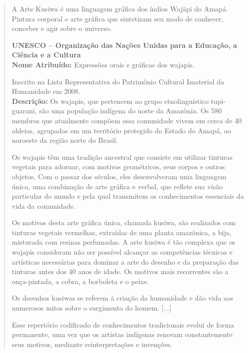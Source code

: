 \begin{quote}
A Arte Kusiwa é uma linguagem gráfica dos índios Wajãpi do Amapá.
Pintura corporal e arte gráfica que sintetizam seu modo de conhecer,
conceber e agir sobre o universo.

\textbf{UNESCO -- Organização das Nações Unidas para a Educação, a
Ciência e a Cultura}\\
\textbf{Nome Atribuído:} Expressões orais e gráficas dos wajapis.

Inscrito na Lista Representativa do Patrimônio Cultural Imaterial da
Humanidade em 2008.\\
\textbf{Descrição:} Os wajapis, que pertencem ao grupo etnolinguístico
tupi-guarani, são uma população indígena do norte da Amazônia. Os 580
membros que atualmente compõem essa comunidade vivem em cerca de 40
aldeias, agrupadas em um território protegido do Estado do Amapá, ao
noroeste da região norte do Brasil.

Os wajapis têm uma tradição ancestral que consiste em utilizar tinturas
vegetais para adornar, com motivos geométricos, seus corpos e outros
objetos. Com o passar dos séculos, eles desenvolveram uma linguagem
única, uma combinação de arte gráfica e verbal, que reflete sua visão
particular do mundo e pela qual transmitem os conhecimentos essenciais
da vida da comunidade.

Os motivos desta arte gráfica única, chamada kusiwa, são realizados com
tinturas vegetais vermelhas, extraídas de uma planta amazônica, a bija,
misturada com resinas perfumadas. A arte kusiwa é tão complexa que os
wajapis consideram não ser possível alcançar as competências técnicas e
artísticas necessárias para dominar a arte do desenho e da preparação
das tinturas antes dos 40 anos de idade. Os motivos mais recorrentes são
a onça-pintada, a cobra, a borboleta e o peixe.

Os desenhos kusiwas se referem à criação da humanidade e dão vida aos
numerosos mitos sobre o surgimento do homem. {[}...{]}

Esse repertório codificado de conhecimentos tradicionais evolui de forma
permanente, uma vez que os artistas indígenas renovam constantemente
seus motivos, mediante reinterpretações e invenções.

\end{quote}

